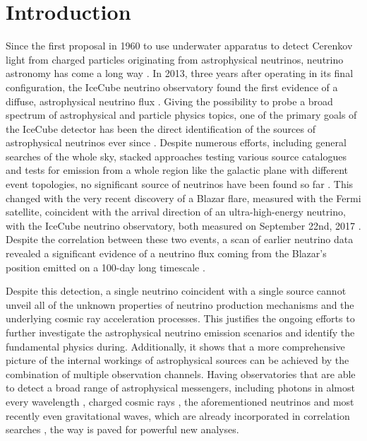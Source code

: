 \chapter{Introduction}

Since the first proposal in  1960 to use underwater apparatus to detect Cerenkov light from charged particles originating from astrophysical neutrinos, neutrino astronomy has come a long way .
In 2013, three years after operating in its final configuration, the IceCube neutrino observatory found the first evidence of a diffuse, astrophysical neutrino flux .
Giving the possibility to probe a broad spectrum of astrophysical and particle physics topics, one of the primary goals of the IceCube detector has been the direct identification of the sources of astrophysical neutrinos ever since .
Despite numerous efforts, including general searches of the whole sky, stacked approaches testing various source catalogues and tests for emission from a whole region like the galactic plane with different event topologies, no significant source of neutrinos have been found so far .
This changed with the very recent discovery of a Blazar flare, measured with the Fermi satellite, coincident with the arrival direction of an ultra-high-energy neutrino, with the IceCube neutrino observatory, both measured on September 22nd, 2017 .
Despite the correlation between these two events, a scan of earlier neutrino data revealed a significant evidence of a neutrino flux coming from the Blazar's position emitted on a 100-day long timescale .

Despite this detection, a single neutrino coincident with a single source cannot unveil all of the unknown properties of neutrino production mechanisms and the underlying cosmic ray acceleration processes.
This justifies the ongoing efforts to further investigate the astrophysical neutrino emission scenarios and identify the fundamental physics during.
Additionally, it shows that a more comprehensive picture of the internal workings of astrophysical sources can be achieved by the combination of multiple observation channels.
Having observatories that are able to detect a broad range of astrophysical messengers, including photons in almost every wavelength , charged cosmic rays , the aforementioned neutrinos and most recently even gravitational waves, which are already incorporated in correlation searches , the way is paved for powerful new analyses.

